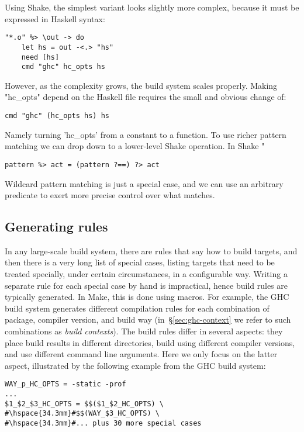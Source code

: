\noindent Using Shake, the simplest variant looks slightly more complex, because
it must be expressed in Haskell syntax:

\begin{lstlisting}
"*.o" %> \out -> do
    let hs = out -<.> "hs"
    need [hs]
    cmd "ghc" hc_opts hs
\end{lstlisting}
\noindent
However, as the complexity grows, the build system scales properly. Making
\lst"hc_opts" depend on the Haskell file requires the small and obvious change of:

\begin{lstlisting}
cmd "ghc" (hc_opts hs) hs
\end{lstlisting}

\noindent Namely turning \lst'hc_opts' from a constant to a function. To use
richer pattern matching we can drop down to a lower-level Shake operation. In
Shake \lst"%

\begin{lstlisting}
pattern %> act = (pattern ?==) ?> act
\end{lstlisting}
\noindent
Wildcard pattern matching is just a special case, and we can use an
arbitrary predicate to exert more precise control over what matches.

\subsection{Generating rules}

In any large-scale build system, there are rules that say how to build targets,
and then there is a very long list of special cases, listing targets that need
to be treated specially, under certain circumstances, in a configurable way.
Writing a separate rule for each special case by hand is impractical, hence
build rules are typically generated. In Make, this is done using macros.
For example, the GHC build system generates different compilation rules
for each combination of package, compiler version, and build way
(in~\S\ref{sec:ghc-context} we refer to such combinations as \emph{build
contexts}). The build rules differ in several aspects: they place build results
in different directories, build using different compiler versions, and use
different command line arguments. Here we only focus on the latter aspect,
illustrated by the following example from the GHC build system:

\begin{lstlisting}
WAY_p_HC_OPTS = -static -prof
...
$1_$2_$3_HC_OPTS = $$($1_$2_HC_OPTS) \
#\hspace{34.3mm}#$$(WAY_$3_HC_OPTS) \
#\hspace{34.3mm}#... plus 30 more special cases
\end{lstlisting}

